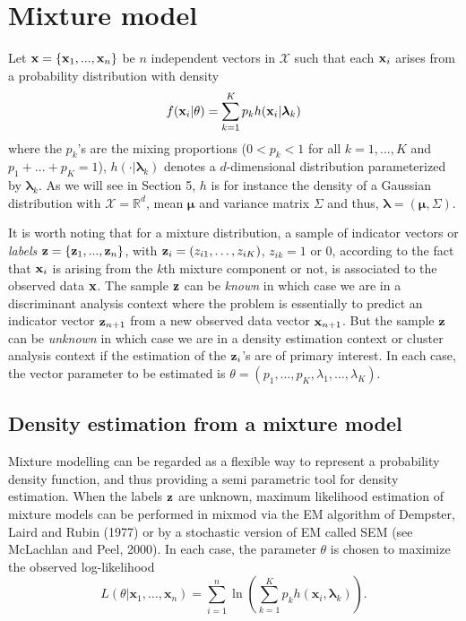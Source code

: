 \documentclass[12pt]{article}
\newcommand{\IR}{\mathbb{R}}
\newcommand{\bx}{\mathbf{x}}
\newcommand{\blambda}{\boldsymbol{\lambda}}
\newcommand{\bmu}{\boldsymbol{\mu}}
\begin{document}
\section{Mixture model}
Let ${\bf x}=\{ {\bf x}_1,...,{\bf x}_n\}$ be $n$ independent vectors in ${\mathcal X}$ such that each
${\bf x}_i$ arises from a probability distribution with density
\begin{eqnarray}
  f({\bf x}_i|\theta) = \sum_{k=1}^K p_k h({\bf x}_{i}|
\blambda_{k})
\end{eqnarray}
where the $p_k$'s are the mixing proportions ($0<p_k<1$ for all $k=1,...,K$ and
$p_1+...+p_K=1$), $h(\cdot| \blambda_{k})$ denotes a $d$-dimensional distribution parameterized
by $\blambda_k$. As we will see in Section 5, $h$ is for instance the density of a Gaussian
distribution with ${\mathcal X}=\IR^d$, mean $\bmu$ and variance matrix $\Sigma$ and thus, $\blambda=(\bmu, \Sigma)$.

It is worth noting that for a mixture distribution, a sample of indicator vectors or {\em
  labels} ${\bf z}=\{ {\bf z}_1,...,{\bf z}_n\}$, with ${\bf z}_i=(z_{i1},\ldots,z_{iK})$,
$z_{ik}=1$ or 0, according to the fact that ${\bf x}_i$ is arising from the $k$th mixture
component or not, is associated to the observed data ${\bf x}$. The sample ${\bf z}$ can be
{\em known} in which case we are in a discriminant analysis context where the problem is
essentially to predict an indicator vector ${\bf z}_{n+1}$ from a new observed data vector
${\bf x}_{n+1}$. But the sample ${\bf z}$ can be {\em unknown} in which case we are in a
density estimation context or cluster analysis context if the estimation of the ${\bf z}_i$'s
are of primary interest. In each case, the vector parameter to be estimated is
$\theta=(p_1,\ldots,p_K,\lambda_1,\ldots,\lambda_K)$.

\subsection{Density estimation from a mixture model}
Mixture modelling can be regarded as a flexible way to represent a probability density
function, and thus providing a semi parametric tool for density estimation.  When the labels
${\bf z}$ are unknown, maximum likelihood estimation of mixture models can be performed in {\sc
  mixmod} via the EM algorithm of Dempster, Laird and Rubin (1977) or by a stochastic version
of EM called SEM (see McLachlan and Peel, 2000). In each case, the parameter $\theta$ is chosen
to maximize the observed log-likelihood
\begin{equation}
  \label{eq:vraisemblance}
  L(\theta|\bx_1,\ldots,\bx_n)=\sum_{i=1}^n \ln \left(\sum_{k=1}^K p_k h(\bx_i,\blambda_k)\right).
\end{equation}
\end{document}
